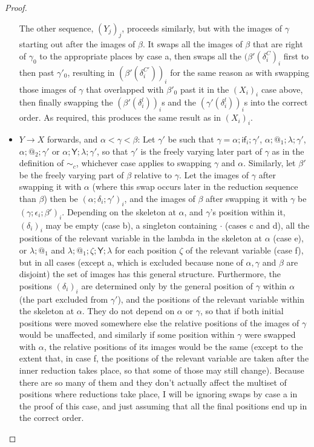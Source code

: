 \documentclass{article}
\newcommand{\tY}{\mathsf{Y}}
\theoremstyle{definition}
\theoremstyle{lemma}
\theoremstyle{remark}
\begin{document}
\begin{proof}
\begin{itemize}
  The other sequence, $(Y_j)_j$, proceeds similarly, but with the images of $\gamma$ starting out after the images of $\beta$. It swaps all the images of $\beta$ that are right of $\gamma_0$ to the appropriate places by case a, then swaps all the $(\beta'(\delta^C_i)_i$ first to then past $\gamma'_0$, resulting in $(\beta'(\delta^{C'}_i))_i$ for the same reason as with swapping those images of $\gamma$ that overlapped with $\beta'_0$ past it in the $(X_i)_i$ case above, then finally swapping the $(\beta'(\delta^l_i))_i$s and the $(\gamma'(\delta^l_i))_i$s into the correct order. As required, this produces the same result as in $(X_i)_i$.
  \item $Y \to X$ forwards, and $\alpha < \gamma < \beta$: Let $\gamma'$ be such that $\gamma = \alpha;\textsf{if}_i;\gamma'$, $\alpha;@_1;\lambda;\gamma'$, $\alpha;@_2;\gamma'$ or $\alpha;\tY;\lambda;\gamma'$, so that $\gamma'$ is the freely varying later part of $\gamma$ as in the definition of $\sim_c$, whichever case applies to swapping $\gamma$ and $\alpha$. Similarly, let $\beta'$ be the freely varying part of $\beta$ relative to $\gamma$. Let the images of $\gamma$ after swapping it with $\alpha$ (where this swap occurs later in the reduction sequence than $\beta$) then be $(\alpha;\delta_i;\gamma')_i$, and the images of $\beta$ after swapping it with $\gamma$ be $(\gamma;\epsilon_i;\beta')_i$. Depending on the skeleton at $\alpha$, and $\gamma$'s position within it, $(\delta_i)_i$ may be empty (case b), a singleton containing $\cdot$ (cases c and d), all the positions of the relevant variable in the lambda in the skeleton at $\alpha$ (case e), or $\lambda;@_1$ and $\lambda;@_1;\zeta;\tY;\lambda$ for each position $\zeta$ of the relevant variable (case f), but in all cases (except a, which is excluded because none of $\alpha, \gamma$ and $\beta$ are disjoint) the set of images has this general structure. Furthermore, the positions $(\delta_i)_i$ are determined only by the general position of $\gamma$ within $\alpha$ (the part excluded from $\gamma'$), and the positions of the relevant variable within the skeleton at $\alpha$. They do not depend on $\alpha$ or $\gamma$, so that if both initial positions were moved somewhere else the relative positions of the images of $\gamma$ would be unaffected, and similarly if some position within $\gamma$ were swapped with $\alpha$, the relative positions of its images would be the same (except to the extent that, in case f, the positions of the relevant variable are taken after the inner reduction takes place, so that some of those may still change). Because there are so many of them and they don't actually affect the multiset of positions where reductions take place, I will be ignoring swaps by case a in the proof of this case, and just assuming that all the final positions end up in the correct order.
  

\end{itemize}
\end{proof}
\end{document}
